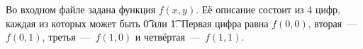 Во входном файле задана функция $f(x, y)$. Её описание состоит из 4 цифр, каждая из которых может быть \t{0} или \t{1}. Первая цифра равна $f(0, 0)$, вторая~---~$f(0, 1)$, третья~---~$f(1, 0)$ и четвёртая~---~$f(1, 1)$.
